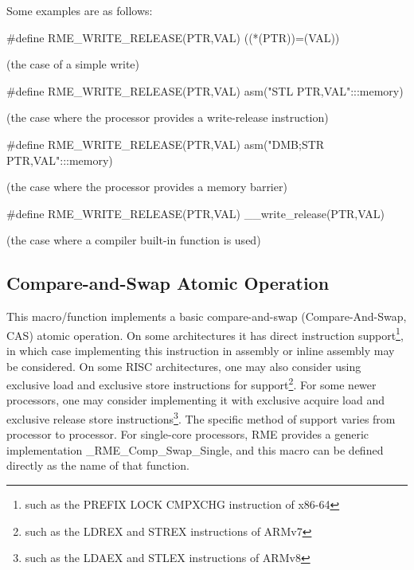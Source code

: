 Some examples are as follows:

\#define RME\_WRITE\_RELEASE(PTR,VAL) ((*(PTR))=(VAL))

(the case of a simple write)

\#define RME\_WRITE\_RELEASE(PTR,VAL) asm("STL PTR,VAL":::memory)

(the case where the processor provides a write-release instruction)

\#define RME\_WRITE\_RELEASE(PTR,VAL) asm("DMB;STR PTR,VAL":::memory)

(the case where the processor provides a memory barrier)

\#define RME\_WRITE\_RELEASE(PTR,VAL) \_\_write\_release(PTR,VAL)

(the case where a compiler built-in function is used)

\newpage
\subsection{Compare-and-Swap Atomic Operation}\label{subsec:7-compare-and-swap-atomic-operation}

This macro/function implements a basic compare-and-swap (Compare-And-Swap, CAS) atomic operation. On some architectures it has direct instruction support\footnote{such as the PREFIX LOCK CMPXCHG instruction of x86-64}, in which case implementing this instruction in assembly or inline assembly may be considered. On some RISC architectures, one may also consider using exclusive load and exclusive store instructions for support\footnote{such as the LDREX and STREX instructions of ARMv7}. For some newer processors, one may consider implementing it with exclusive acquire load and exclusive release store instructions\footnote{such as the LDAEX and STLEX instructions of ARMv8}. The specific method of support varies from processor to processor. For single-core processors, RME provides a generic implementation \_RME\_Comp\_Swap\_Single, and this macro can be defined directly as the name of that function.

